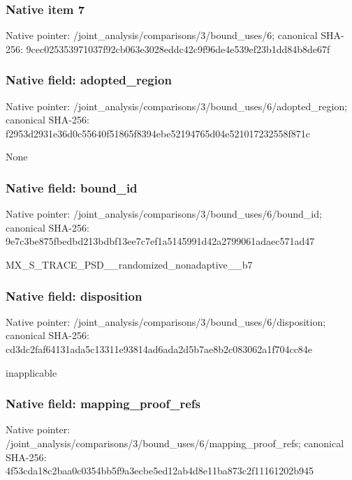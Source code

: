 \documentclass[10pt,a4paper]{article}
\begin{document}
\subsubsection{Native item 7}
Native pointer: /joint\_\allowbreak{}analysis/comparisons/3/bound\_\allowbreak{}uses/6; canonical SHA-256: 9cec025353971037f92cb063e3028eddc42c9f96de4e539ef23b1dd84b8de67f

\subsubsection{Native field: adopted\_\allowbreak{}region}
Native pointer: /joint\_\allowbreak{}analysis/comparisons/3/bound\_\allowbreak{}uses/6/adopted\_\allowbreak{}region; canonical SHA-256: f2953d2931e36d0c55640f51865f8394ebe52194765d04e521017232558f871c

\begingroup\raggedright\sloppy None\par\endgroup

\subsubsection{Native field: bound\_\allowbreak{}id}
Native pointer: /joint\_\allowbreak{}analysis/comparisons/3/bound\_\allowbreak{}uses/6/bound\_\allowbreak{}id; canonical SHA-256: 9e7c3be875fbedbd213bdbf13ee7c7ef1a5145991d42a2799061adaec571ad47

\begingroup\raggedright\sloppy MX\_\allowbreak{}S\_\allowbreak{}TRACE\_\allowbreak{}PSD\_\allowbreak{}\_\allowbreak{}randomized\_\allowbreak{}nonadaptive\_\allowbreak{}\_\allowbreak{}b7\par\endgroup

\subsubsection{Native field: disposition}
Native pointer: /joint\_\allowbreak{}analysis/comparisons/3/bound\_\allowbreak{}uses/6/disposition; canonical SHA-256: cd3dc2faf64131ada5c13311e93814ad6ada2d5b7ae8b2c083062a1f704cc84e

\begingroup\raggedright\sloppy inapplicable\par\endgroup

\subsubsection{Native field: mapping\_\allowbreak{}proof\_\allowbreak{}refs}
Native pointer: /joint\_\allowbreak{}analysis/comparisons/3/bound\_\allowbreak{}uses/6/mapping\_\allowbreak{}proof\_\allowbreak{}refs; canonical SHA-256: 4f53cda18c2baa0c0354bb5f9a3ecbe5ed12ab4d8e11ba873c2f11161202b945
\end{document}
